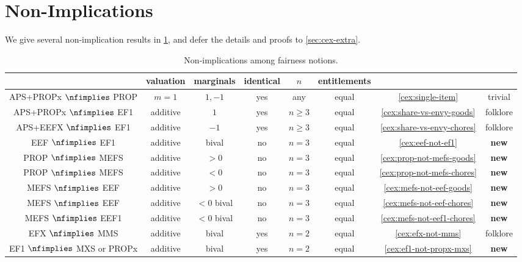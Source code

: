 \section{Non-Implications}
\label{sec:cex}

We give several non-implication results in \cref{table:non-impls},
and defer the details and proofs to \cref{sec:cex-extra}.

\footnotesize
\begin{longtable}{cccccccc}
\caption{Non-implications among fairness notions.}
\label{table:non-impls}
\\ \toprule & \tiny valuation & \tiny marginals & \tiny identical & \tiny $n$ & \tiny entitlements & &
\\ \midrule APS+PROPx $\nfimplies$ PROP
    & $m=1$ & $1, -1$ & yes & any & equal & \cref{cex:single-item} & trivial
\\[\defaultaddspace] APS+PROPx $\nfimplies$ EF1
    & additive & $1$ & yes & $n \ge 3$ & equal & \cref{cex:share-vs-envy-goods} & folklore
\\[\defaultaddspace] APS+EEFX $\nfimplies$ EF1
    & additive & $-1$ & yes & $n \ge 3$ & equal & \cref{cex:share-vs-envy-chores} & folklore
%
\\\midrule EEF $\nfimplies$ EF1
    & additive & bival & no & $n=3$ & equal & \cref{cex:eef-not-ef1} & \textbf{new}
\\[\defaultaddspace] PROP $\nfimplies$ MEFS
    & additive & $> 0$ & no & $n=3$ & equal & \cref{cex:prop-not-mefs-goods} & \textbf{new}
\\[\defaultaddspace] PROP $\nfimplies$ MEFS
    & additive & $< 0$ & no & $n=3$ & equal & \cref{cex:prop-not-mefs-chores} & \textbf{new}
\\[\defaultaddspace] MEFS $\nfimplies$ EEF
    & additive & $> 0$ & no & $n=3$ & equal & \cref{cex:mefs-not-eef-goods} & \textbf{new}
\\[\defaultaddspace] MEFS $\nfimplies$ EEF
    & additive & $< 0$ bival & no & $n=3$ & equal & \cref{cex:mefs-not-eef-chores} & \textbf{new}
\\[\defaultaddspace] MEFS $\nfimplies$ EEF1
    & additive & $< 0$ bival & no & $n=3$ & equal & \cref{cex:mefs-not-eef1-chores} & \textbf{new}
%
\\\midrule EFX $\nfimplies$ MMS
    & additive & bival & yes & $n=2$ & equal & \cref{cex:efx-not-mms} & folklore
\\[\defaultaddspace] EF1 $\nfimplies$ MXS or PROPx
    & additive & bival & yes & $n=2$ & equal & \cref{cex:ef1-not-propx-mxs} & \textbf{new}

\end{longtable}
